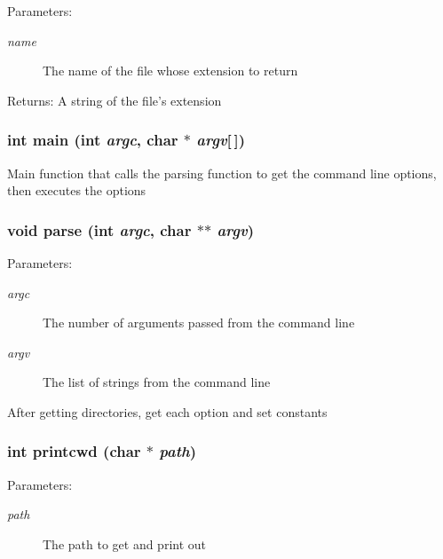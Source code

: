 \begin{Desc}
\item[Parameters:]
\begin{description}
\item[{\em name}]The name of the file whose extension to return \end{description}
\end{Desc}
\begin{Desc}
\item[Returns:]A string of the file's extension \end{Desc}
\subsubsection{\setlength{\rightskip}{0pt plus 5cm}int main (int {\em argc}, char $\ast$ {\em argv}[$\,$])}\label{dir_8c_0ddf1224851353fc92bfbff6f499fa97}


Main function that calls the parsing function to get the command line options, then executes the options 
\subsubsection{\setlength{\rightskip}{0pt plus 5cm}void parse (int {\em argc}, char $\ast$$\ast$ {\em argv})}\label{dir_8c_66fa8f960eac1bf561ba2cb8be0cc58a}


\begin{Desc}
\item[Parameters:]
\begin{description}
\item[{\em argc}]The number of arguments passed from the command line \item[{\em argv}]The list of strings from the command line\end{description}
\end{Desc}
After getting directories, get each option and set constants 
\subsubsection{\setlength{\rightskip}{0pt plus 5cm}int printcwd (char $\ast$ {\em path})}\label{dir_8c_6d7841070d2de02a436b0c1ddd0a33f4}


\begin{Desc}
\item[Parameters:]
\begin{description}
\item[{\em path}]The path to get and print out \end{description}
\end{Desc}
